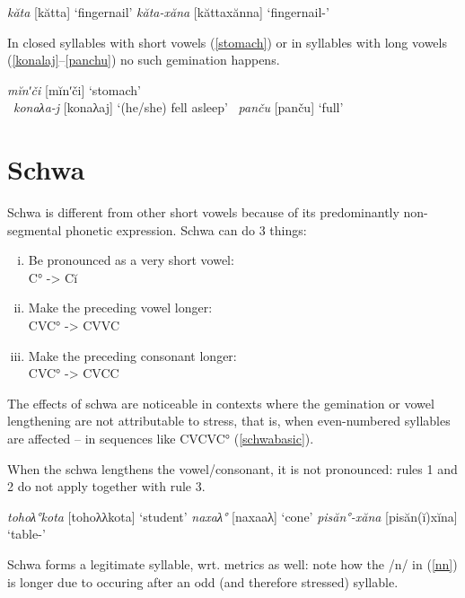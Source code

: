 \documentclass[a4paper, 12pt]{article}
\begin{document}
	\pex\label{complen}\a \emph{kăta} [kătta] \hfill `fingernail'
		\a \emph{kăta-xăna} [kăttaxănna] \hfill `fingernail-{\Ins}'
	\xe
	
	In closed syllables with short vowels (\ref{stomach}) or in syllables with long vowels (\ref{konalaj}--\ref{panchu}) no such gemination happens.
	
	\ex\label{stomach}\emph{mĭnʹči} [mĭnʹči] \hfill `stomach' 	\\\hfill \parencite[p. 22]{sammallahti1974}\xe
	\ex~\label{konalaj}\emph{konaλa-j} [konaλaj] \hfill `(he/she) fell asleep' \xe
	\ex~\label{panchu}\emph{panču} [panču] \hfill `full' \\\hfill \parencite[p. 22]{sammallahti1974}\xe
	
		\section{Schwa}
	
	Schwa is different from other short vowels because of its predominantly non-segmental phonetic expression. Schwa can do 3 things:
	
	\begin{enumerate}[i.]
		\item Be pronounced as a very short vowel:\\ 
			C° -> Cĭ
		\item Make the preceding vowel longer:\\
			CVC° -> CVVC
		\item Make the preceding consonant longer:\\ 
			CVC° -> CVCC
	\end{enumerate}
	
	The effects of schwa are noticeable in contexts where the gemination or vowel lengthening are not attributable to stress, that is, when even-numbered syllables are affected -- in sequences like CVCVC° (\ref{schwabasic}).
	
	When the schwa lengthens the vowel/consonant, it is not pronounced: rules 1 and 2 do not apply together with rule 3. 
	
	\pex\label{schwabasic}\a \emph{tohoλ°kota} [tohoλλkota] \hfill `student'
		\a \emph{naxaλ°} [naxaaλ] \hfill `cone'
		\a \emph{pisăn°-xăna} [pisăn(ĭ)xĭna] \hfill `table-{\Ins}'
	\xe
	
	Schwa forms a legitimate syllable, wrt. metrics as well: note how the /n/ in (\ref{nn}) is longer due to occuring after an odd (and therefore stressed) syllable.
	
\end{document}
